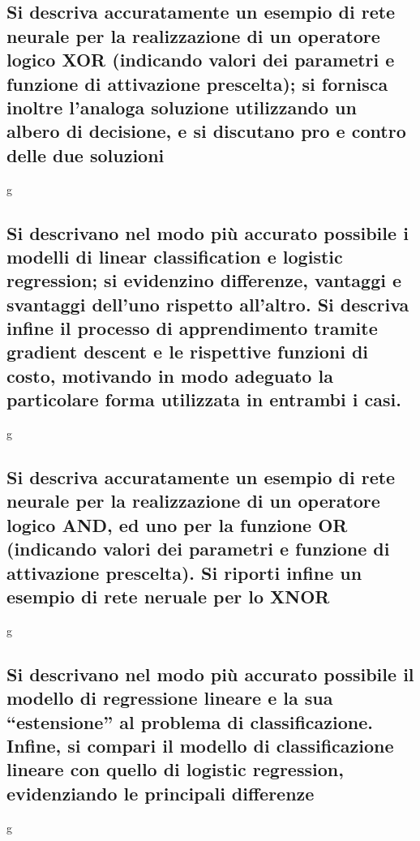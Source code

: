 \documentclass[10pt,oneside,a4paper]{article}
\begin{document}
\subsection{Si descriva accuratamente un esempio di rete neurale per la realizzazione di un operatore logico XOR (indicando valori dei parametri e funzione di attivazione prescelta); si fornisca inoltre l’analoga soluzione utilizzando un albero di decisione, e si discutano pro e contro delle due soluzioni}
g
\subsection{Si descrivano nel modo più accurato possibile i modelli di linear classification e logistic regression; si evidenzino differenze, vantaggi e svantaggi dell’uno rispetto all’altro. Si descriva infine il processo di apprendimento tramite gradient descent e le rispettive funzioni di costo, motivando in modo adeguato la particolare forma utilizzata in entrambi i casi.}
g
\subsection{Si descriva accuratamente un esempio di rete neurale per la realizzazione di un operatore logico AND, ed uno per la funzione OR (indicando valori dei parametri e funzione di attivazione prescelta). Si riporti infine un esempio di rete neruale per lo XNOR}
g
\subsection{Si descrivano nel modo più accurato possibile il modello di regressione lineare e la sua “estensione” al problema di classificazione. Infine, si compari il modello di classificazione lineare con quello di logistic regression, evidenziando le principali differenze}
g
\end{document}
